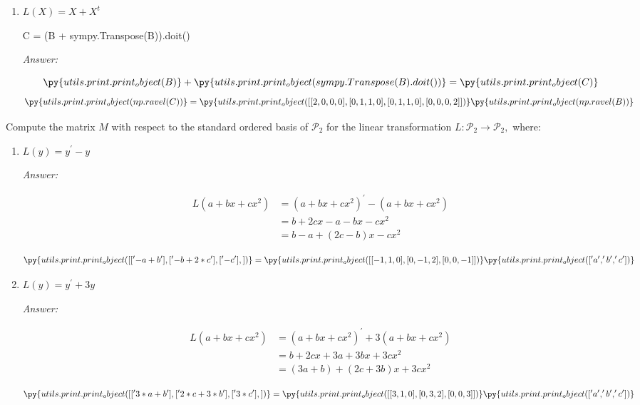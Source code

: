 \documentclass[letterpaper]{article}
\newcommand{\ans}{\textit{Answer: }}
\newenvironment{question}[2][Question]{\begin{trivlist}
\item[\hskip \labelsep {\bfseries #1}\hskip \labelsep {\bfseries #2.}]}{\end{trivlist}}
\newcommand{\printobj}[1]{\py{utils.print.print_object(#1)}}
\begin{document}
\begin{question}{3.126}
\begin{enumerate}[label=\textbf{(\alph*)}]
    \item[\textbf{(e)}] $L ( X ) = X + X ^ { t }$
        
    \begin{pycode}
C = (B + sympy.Transpose(B)).doit()
    \end{pycode}

    \ans 

    $$\printobj{B} + \printobj{sympy.Transpose(B).doit()} = \printobj{C}$$
    $$\printobj{np.ravel(C)} 
    = \printobj{[
      [2, 0, 0, 0],
      [0, 1, 1, 0],
      [0, 1, 1, 0],
      [0, 0, 0, 2]
    ]} \printobj{np.ravel(B)}$$ 

  \end{enumerate}
\end{question}

\begin{question}{3.130}
  Compute the matrix $M$ with respect to the standard ordered basis of $\mathcal { P } _ { 2 }$ for
  the linear transformation $L : \mathcal { P } _ { 2 } \rightarrow \mathcal { P } _ { 2 } ,$ where:

  \begin{enumerate}
    \item[\textbf{(c)}] $L ( y ) = y ^ { \prime } - y$
    
    \ans 

    \begin{align*}
      L(a + bx + cx^2) &= (a + bx + cx^2) ^ { \prime } - (a + bx + cx^2) \\
      &= b + 2cx - a - bx - cx^2 \\
      &= b - a + (2c - b)x - cx^2
    \end{align*}

    $$\printobj{[
      ['-a + b'],
      ['-b + 2*c'],
      ['-c'],
    ]} = \printobj{[
      [-1, 1, 0],
      [0, -1, 2],
      [0, 0, -1]
    ]} \printobj{['a', 'b', 'c']}$$

    \item[\textbf{(d)}] $L ( y ) = y ^ { \prime } + 3 y$
    
    \ans

    \begin{align*}
      L(a + bx + cx^2) &= (a + bx + cx^2) ^ { \prime } + 3 (a + bx + cx^2) \\
      &= b + 2cx + 3a + 3bx + 3cx^2 \\
      &= (3a + b) + (2c + 3b)x + 3cx^2
    \end{align*}

    $$\printobj{[
      ['3*a + b'],
      ['2*c + 3*b'],
      ['3*c'],
    ]} = \printobj{[
      [3, 1, 0],
      [0, 3, 2],
      [0, 0, 3]
    ]} \printobj{['a', 'b', 'c']}$$


\end{enumerate}
\end{question}
\end{document}
